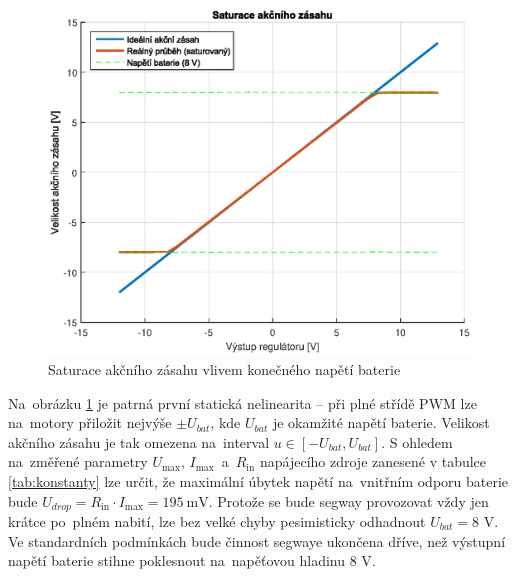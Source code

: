 \documentclass[conference]{IEEEtran}
\begin{document}
\begin{figure}[htbp]
    \centerline{\includegraphics[width=\linewidth]{pwm_saturace.eps}}
    \caption{Saturace akčního zásahu vlivem konečného napětí baterie}
    \label{fig:pwm_saturace}        
\end{figure}

Na~obrázku \ref{fig:pwm_saturace} je patrná první statická nelinearita -- při plné střídě PWM lze na~motory přiložit nejvýše $\pm U_{bat}$,
kde $U_{bat}$ je okamžité napětí baterie. Velikost akčního zásahu je tak omezena na~interval $u \in [-U_{bat}, U_{bat}]$.
S ohledem na~změřené parametry $U_\text{max}$, $I_\text{max}$~a~$R_\text{in}$ napájecího zdroje zanesené v tabulce \ref{tab:konstanty} lze určit,
že maximální úbytek napětí na~vnitřním odporu baterie bude $U_{drop} = R_\text{in} \cdot I_\text{max} = 195~\si{\milli\volt}$.
Protože se bude segway provozovat vždy jen krátce po~plném nabití, lze bez velké chyby pesimisticky odhadnout $U_{bat} = 8$ \si{V}.
Ve standardních podmínkách bude činnost segwaye ukončena dříve, než výstupní napětí baterie stihne poklesnout na~napěťovou hladinu 8 \si{V}.
\end{document}
